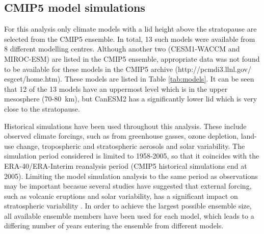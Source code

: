 \subsection{CMIP5 model simulations}

For this analysis only climate models with a lid height above the stratopause
are selected from the CMIP5 ensemble. In total, 13 such models were available
from 8 different modelling centres. Although another two (CESM1-WACCM and
MIROC-ESM) are listed in the CMIP5 ensemble, appropriate data was not found to
be available for these models in the CMIP5 archive (http://pcmdi3.llnl.gov/
esgcet/home.htm). These models are listed in Table \ref{tab:models}. It can be
seen that 12 of the 13 models have an uppermost level which is in the upper
mesosphere (70-80~km), but CanESM2 has a significantly lower lid which is very
close to the stratopause.

Historical simulations have been used throughout this analysis. These include
observed climate forcings, such as from greenhouse gasses, ozone depletion,
land-use change, tropospheric and stratospheric aerosols and solar
variability. The simulation period considered is limited to 1958-2005, so that
it coincides with the ERA-40/ERA-Interim reanalysis period (CMIP5 historical
simulations end at 2005). Limiting the model simulation analysis to the same
period as observations may be important becasue several studies have suggested
that external forcing, such as volcanic eruptions and solar variability, has a
significant impact on stratospheric variability \citep{Kodera1994,Gray2010}. In
order to achieve the largest possible ensemble size, all available ensemble
members have been used for each model, which leads to a differing number of
years entering the ensemble from different models.


